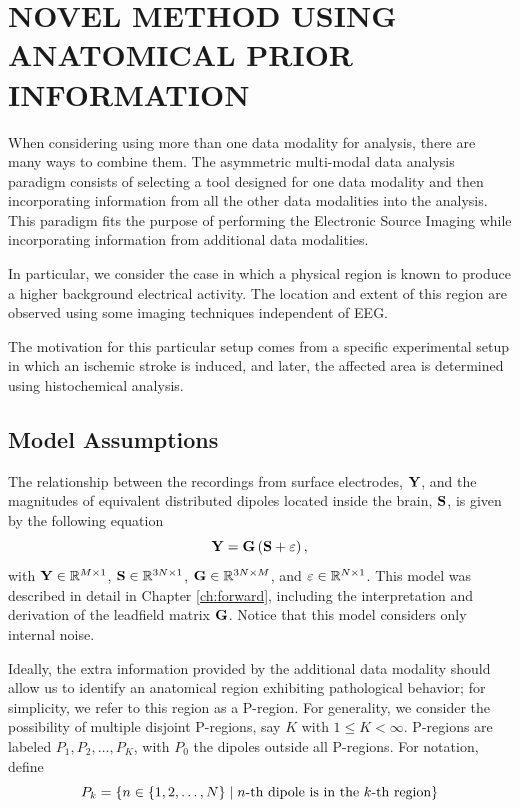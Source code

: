 \chapter{NOVEL METHOD USING ANATOMICAL PRIOR INFORMATION}
\label{ch:new_model}
%


When considering using more than one data modality for analysis, there are many ways to combine them. 
%
The asymmetric multi-modal data analysis paradigm consists of selecting a tool designed for one data modality and then incorporating information from all the other data modalities into the analysis.
%
This paradigm fits the purpose of performing the Electronic Source Imaging while incorporating information from additional data modalities.


In particular, we consider the case in which a physical region is known to produce a higher background electrical activity.
%
The location and extent of this region are observed using some imaging techniques independent of EEG.

The motivation for this particular setup comes from a specific experimental setup in which an ischemic stroke is induced, and later, the affected area is determined using histochemical analysis.

\section{Model Assumptions}

The relationship between the recordings from surface electrodes, $\mathbf{Y}$, and the magnitudes of equivalent distributed dipoles located inside the brain, $\mathbf{S}$, is given by the following equation
\begin{equation}
\mathbf{Y} = \mathbf{G} \left( \mathbf{S} + \varepsilon \right),
\label{eq:3.1}
\end{equation}
with $\mathbf{Y} \in \mathbb{R}^{M \times 1}$, $\mathbf{S} \in \mathbb{R}^{3N \times 1}$, $\mathbf{G} \in \mathbb{R}^{3N\times M}$, and $\varepsilon\in \mathbb{R}^{N\times 1}$.
%
This model was described in detail in Chapter \ref{ch:forward}, including the interpretation and derivation of the leadfield matrix $\mathbf{G}$.
%
Notice that this model considers only internal noise.

Ideally, the extra information provided by the additional data modality should allow us to identify an anatomical region exhibiting pathological behavior; for simplicity, we refer to this region as a P-region. 
%
For generality, we consider the possibility of multiple disjoint P-regions, say $K$ with $1\leq K < \infty$.
%
P-regions are labeled $P_1, P_2, \dots, P_K$, with $P_0$ the dipoles outside all P-regions.
%
For notation, define 
\begin{equation}
    P_k = \left\{  n\in \left\{ 1, 2, \dots, N \right\} \;\middle|\; n\text{-th dipole is in the } k\text{-th region}  \right\}
\end{equation}

